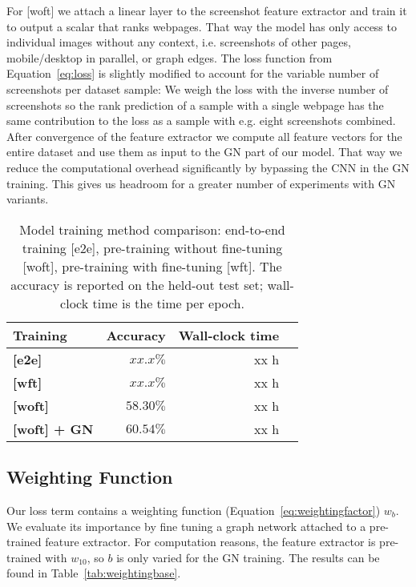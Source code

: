 For [woft] we attach a linear layer to the screenshot feature extractor and train it to output a scalar that ranks webpages. That way the model has only access to individual images without any context, i.e. screenshots of other pages, mobile/desktop in parallel, or graph edges. The loss function from Equation~\ref{eq:loss} is slightly modified to account for the variable number of screenshots per dataset sample: We weigh the loss with the inverse number of screenshots so the rank prediction of a sample with a single webpage has the same contribution to the loss as a sample with e.g. eight screenshots combined. After convergence of the feature extractor we compute all feature vectors for the entire dataset and use them as input to the GN part of our model. That way we reduce the computational overhead significantly by bypassing the CNN in the GN training. This gives us headroom for a greater number of experiments with GN variants.

\begin{table}
    \centering
    \begin{tabular}{lrrr}
        \textbf{Training} & \textbf{Accuracy} & \textbf{Wall-clock time}\\\hline
        \textbf{[e2e]} & $xx.x\%$ & xx h\\
        \textbf{[wft]} & $xx.x\%$ & xx h\\
        \textbf{[woft]} & $58.30\%$ & xx h\\
        \textbf{[woft] + GN} & $60.54\%$ & xx h\\
    \end{tabular}
    \caption[Model training method comparison]{Model training method comparison: end-to-end training [e2e], pre-training without fine-tuning [woft], pre-training with fine-tuning [wft]. The accuracy is reported on the held-out test set; wall-clock time is the time per epoch.}
    \label{tab:trainmethodcomparison}
\end{table}

\subsection{Weighting Function}

Our loss term contains a weighting function (Equation~\ref{eq:weightingfactor}) $w_b$. We evaluate its importance by fine tuning a graph network attached to a pre-trained feature extractor. For computation reasons, the feature extractor is pre-trained with $w_{10}$, so $b$ is only varied for the GN training. The results can be found in Table~\ref{tab:weightingbase}.

